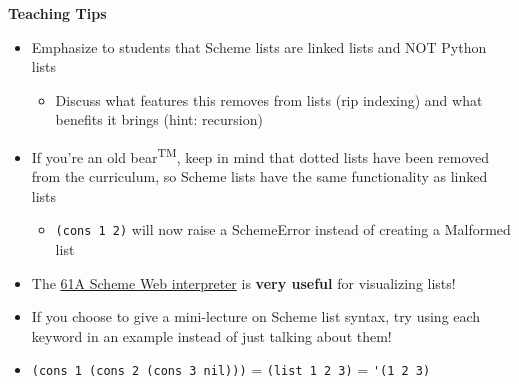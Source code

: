 \begin{blocksection}
\begin{guide}
\textbf{Teaching Tips}
\begin{itemize}
  \item Emphasize to students that Scheme lists are linked lists and NOT Python lists
  \begin{itemize}
    \item Discuss what features this removes from lists (rip indexing) and what benefits it brings (hint: recursion)
  \end{itemize}
  \item If you're an old bear\textsuperscript{TM}, keep in mind that dotted lists have been removed from the curriculum, so Scheme lists have the same functionality as linked lists
  \begin{itemize}
    \item \lstinline{(cons 1 2)} will now raise a SchemeError instead of creating a Malformed list
  \end{itemize}
  \item The \href{https://code.cs61a.org/}{61A Scheme Web interpreter} is \textbf{very useful} for visualizing lists!
  \item If you choose to give a mini-lecture on Scheme list syntax, try using each keyword in an example instead of just talking about them!
  \item \lstinline{(cons 1 (cons 2 (cons 3 nil)))} = \lstinline{(list 1 2 3)} = \lstinline{'(1 2 3)}
\end{itemize}
\end{guide}
\end{blocksection}
